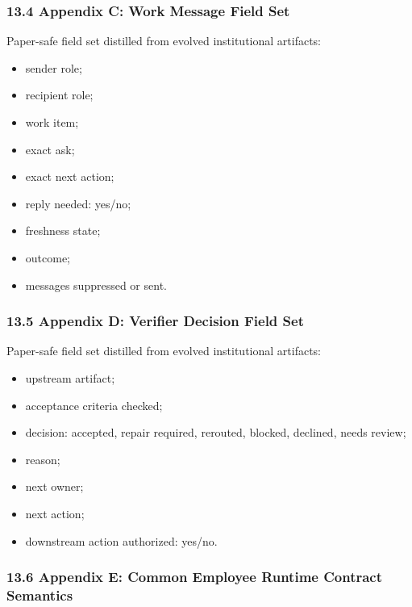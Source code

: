 \documentclass[
]{article}
\providecommand{\tightlist}{%
  \setlength{\itemsep}{0pt}\setlength{\parskip}{0pt}}
\begin{document}
\subsubsection{13.4 Appendix C: Work Message Field Set}\label{appendix-c-work-message-field-set}

Paper-safe field set distilled from evolved institutional artifacts:

\begin{itemize}
\tightlist
\item
  sender role;
\item
  recipient role;
\item
  work item;
\item
  exact ask;
\item
  exact next action;
\item
  reply needed: yes/no;
\item
  freshness state;
\item
  outcome;
\item
  messages suppressed or sent.
\end{itemize}

\subsubsection{13.5 Appendix D: Verifier Decision Field Set}\label{appendix-d-verifier-decision-field-set}

Paper-safe field set distilled from evolved institutional artifacts:

\begin{itemize}
\tightlist
\item
  upstream artifact;
\item
  acceptance criteria checked;
\item
  decision: accepted, repair required, rerouted, blocked, declined, needs review;
\item
  reason;
\item
  next owner;
\item
  next action;
\item
  downstream action authorized: yes/no.
\end{itemize}

\subsubsection{13.6 Appendix E: Common Employee Runtime Contract Semantics}\label{appendix-e-common-employee-runtime-contract-semantics}
\end{document}
